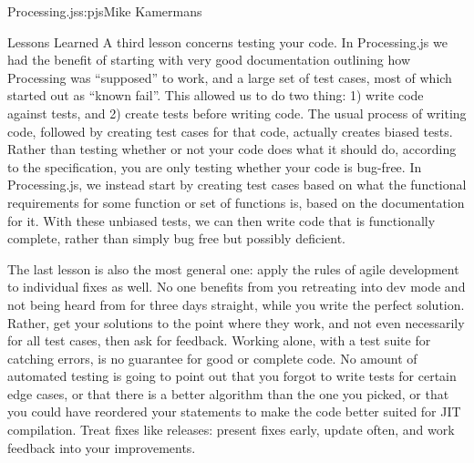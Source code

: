 \begin{aosachapter}{Processing.js}{s:pjs}{Mike Kamermans}
\begin{aosasect1}{Lessons Learned}
A third lesson concerns testing your code. In Processing.js we had the
benefit of starting with very good documentation outlining how
Processing was ``supposed'' to work, and a large set of test cases, most
of which started out as ``known fail''. This allowed us to do two thing:
1) write code against tests, and 2) create tests before writing
code. The usual process of writing code, followed by creating test
cases for that code, actually creates biased tests. Rather than
testing whether or not your code does what it should do, according to
the specification, you are only testing whether your code is
bug-free. In Processing.js, we instead start by creating test cases
based on what the functional requirements for some function or set of
functions is, based on the documentation for it. With these unbiased
tests, we can then write code that is functionally complete, rather
than simply bug free but possibly deficient.

The last lesson is also the most general one: apply the rules of agile
development to individual fixes as well. No one benefits from you
retreating into dev mode and not being heard from for three days
straight, while you write the perfect solution. Rather, get your
solutions to the point where they work, and not even necessarily for
all test cases, then ask for feedback. Working alone, with a test
suite for catching errors, is no guarantee for good or complete
code. No amount of automated testing is going to point out that you
forgot to write tests for certain edge cases, or that there is a
better algorithm than the one you picked, or that you could have
reordered your statements to make the code better suited for JIT
compilation. Treat fixes like releases: present fixes early, update
often, and work feedback into your improvements.

\end{aosasect1}

\end{aosachapter}
